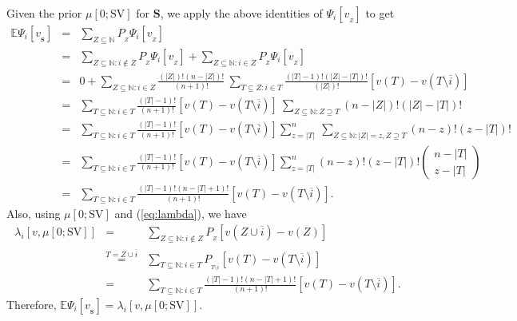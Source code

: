 \documentclass[a4paper,12pt]{article}
\begin{document}
Given the prior $\mu[0; \mathrm{SV}]$ for $\mathbf{S}$, we apply the above identities of $\Psi_i[v_{_Z}]$ to get
$$
\begin{array}{rcl}
\mathbb{E} \Psi_i [v_{_\mathbf{S}}] 
&=&
\sum\limits_{Z\subseteq \mathbb{N}} P_{_Z} \Psi_i[v_{_Z}] \\
&=&
\sum\limits_{Z\subseteq \mathbb{N}: i \not \in Z} P_{_Z} \Psi_i[v_{_Z}] + \sum\limits_{Z\subseteq \mathbb{N}: i \in Z} P_{_Z} \Psi_i[v_{_Z}] \\
&=&
0 + \sum\limits_{Z\subseteq \mathbb{N}: i\in Z} \frac{(|Z|)!(n-|Z|)!}{(n+1)!}\ \sum\limits_{T\subseteq Z: i \in T} \frac{(|T|-1)!(|Z|-|T|)!}{(|Z|)!} \left [ v(T) - v(T\setminus \overline{i})\right ] \\
&=&
\sum\limits_{T\subseteq \mathbb{N}: i \in T} \frac{(|T|-1)!}{(n+1)!} \left [v(T) - v(T\setminus \overline{i})\right ]\ \sum\limits_{Z\subseteq \mathbb{N}: Z \supseteq T} (n-|Z|)! (|Z|-|T|)!  \\
&=&
\sum\limits_{T\subseteq \mathbb{N}: i \in T} \frac{(|T|-1)!}{(n+1)!} \left [v(T) - v(T\setminus \overline{i})\right ] \sum\limits_{z=|T|}^n \ \sum\limits_{Z\subseteq \mathbb{N}: |Z|=z, Z \supseteq T} (n-z)! (z-|T|)!  \\
&=&
\sum\limits_{T\subseteq \mathbb{N}: i \in T} \frac{(|T|-1)!}{(n+1)!} \left [v(T) - v(T\setminus \overline{i})\right ] \sum\limits_{z=|T|}^n  (n-z)! (z-|T|)!
\left ( 
\begin{array}{c}
n-|T| \\
z-|T|
\end{array}  
\right )
\\
&=&
\sum\limits_{T\subseteq \mathbb{N}: i \in T} \frac{(|T|-1)!(n-|T|+1)!}{(n+1)!} \left [ v(T) - v(T\setminus \overline{i})\right ].  
\end{array}
$$
Also, using $\mu[0; \mathrm{SV}]$ and (\ref{eq:lambda}), we have
$$
\begin{array}{rcl}
\lambda_i [v, \mu[0; \mathrm{SV}] ]
&=&
\sum\limits_{Z\subseteq \mathbb{N}: i \not \in Z} P_{_Z} [v(Z\cup \overline{i}) - v(Z)] \\
&\stackrel{T=Z\cup \overline{i}}{=}&
\sum\limits_{T\subseteq \mathbb{N}: i \in T} P_{_{T\setminus \overline{i}}} [v(T) - v(T\setminus \overline{i})] \\
&=&
\sum\limits_{T\subseteq \mathbb{N}: i \in T} \frac{(|T|-1)!(n-|T|+1)!}{(n+1)!} \left [ v(T) - v(T\setminus \overline{i})\right ].  
\end{array}
$$
Therefore, $\mathbb{E} \Psi_i [v_{_\mathbf{S}}]=\lambda_i [v, \mu[0; \mathrm{SV}] ].$ 
\end{document}
